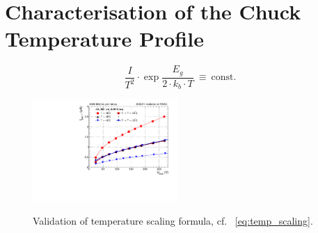 \section{Characterisation of the Chuck Temperature Profile}
\label{appendix:chuck_temp}

\begin{equation}
    \label{eq:temp_scaling}
    \frac{I}{T^2}\cdot \exp{\frac{E_g}{2\cdot k_b \cdot T}}~\equiv~\text{const.}
\end{equation}

\begin{figure}[h]
	\centering
	\includegraphics[width=0.49\textwidth]{plots/iv_temp_scaling/iv_overlay_ch24.pdf}
	\label{plot:iv_tempscaling}
	\caption{
	    Validation of temperature scaling formula, cf. ~\ref{eq:temp_scaling}.
	}
\end{figure}

